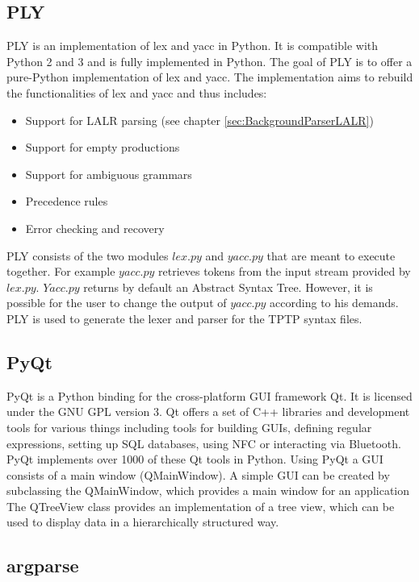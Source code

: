 \subsection{PLY}\label{sec:BackgroundPythonPLY}

\acf{PLY} is an implementation of lex and yacc in Python. It is compatible with Python 2 and 3 and is fully implemented in Python. The goal of \ac{PLY} is to offer a pure-Python implementation of lex and yacc. The implementation aims to rebuild the functionalities of lex and yacc and thus includes:
\begin{itemize}
\item Support for LALR parsing (see chapter \ref{sec:BackgroundParserLALR})
\item Support for empty productions
\item Support for ambiguous grammars 
\item Precedence rules
\item Error checking and recovery
\end{itemize}

\ac{PLY} consists of the two modules $lex.py$ and $yacc.py$ that are meant to execute together. For example $yacc.py$ retrieves tokens from the input stream provided by $lex.py$. $Yacc.py$ returns by default an Abstract Syntax Tree. However, it is possible for the user to change the output of $yacc.py$ according to his demands.
\cite{PLY}
PLY is used to generate the lexer and parser for the \ac{TPTP} syntax files.


\subsection{PyQt}\label{sec:BackgroundPytonPyQt}

PyQt is a Python binding for the cross-platform GUI framework Qt.
It is licensed under the GNU GPL version 3.
Qt offers a set of C++ libraries and development tools for various things including tools for building GUIs, defining regular expressions, setting up SQL databases, using NFC or interacting via Bluetooth.
PyQt implements over 1000 of these Qt tools in Python.
Using PyQt a GUI consists of a main window (QMainWindow).
A simple GUI can be created by subclassing the QMainWindow, which provides a main window for an application
The QTreeView class provides an implementation of a tree view, which can be used to display data in a hierarchically structured way. \cite{PyQt}

\subsection{argparse}\label{sec:BackgroundArgparse}

